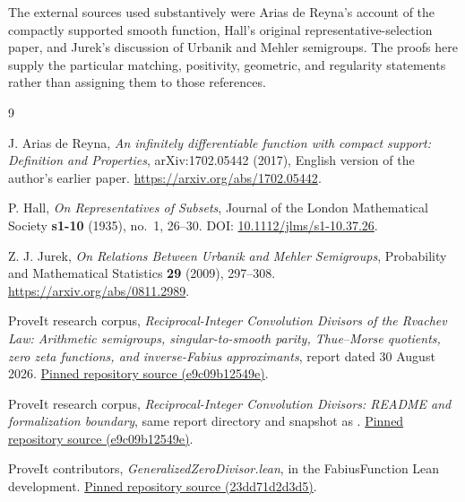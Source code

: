 \documentclass[11pt,a4paper]{article}
\theoremstyle{remark}
\begin{document}
The external sources used substantively were Arias de Reyna's account of the
compactly supported smooth function, Hall's original representative-selection
paper, and Jurek's discussion of Urbanik and Mehler semigroups. The proofs here
supply the particular matching, positivity, geometric, and regularity statements
rather than assigning them to those references.

\begin{thebibliography}{9}

J. Arias de Reyna,
\emph{An infinitely differentiable function with compact support: Definition and
Properties}, arXiv:1702.05442 (2017), English version of the author's earlier
paper.
\url{https://arxiv.org/abs/1702.05442}.

P. Hall,
\emph{On Representatives of Subsets},
Journal of the London Mathematical Society \textbf{s1-10} (1935), no.~1,
26--30. DOI: \href{https://doi.org/10.1112/jlms/s1-10.37.26}{10.1112/jlms/s1-10.37.26}.

Z. J. Jurek,
\emph{On Relations Between Urbanik and Mehler Semigroups},
Probability and Mathematical Statistics \textbf{29} (2009), 297--308.
\url{https://arxiv.org/abs/0811.2989}.

ProveIt research corpus,
\emph{Reciprocal-Integer Convolution Divisors of the Rvachev Law:
Arithmetic semigroups, singular-to-smooth parity, Thue--Morse quotients, zero
zeta functions, and inverse-Fabius approximants}, report dated 30 August 2026.
\href{https://github.com/VladimirReshetnikov/ProveIt/blob/e9c09b12549ea4e3bea7cebc52b450b761f6f581/Analysis/FabiusFunction/docs/semi-formalized-research-frontiers/drafts/spectra-and-arithmetic/Fabius_Rvachev_Reciprocal_Integer_Convolution_Divisors/Fabius_Rvachev_Reciprocal_Integer_Convolution_Divisors.tex}{Pinned repository source (e9c09b12549e)}.

ProveIt research corpus,
\emph{Reciprocal-Integer Convolution Divisors: README and formalization boundary},
same report directory and snapshot as \cite{RepoDivisors}.
\href{https://github.com/VladimirReshetnikov/ProveIt/blob/e9c09b12549ea4e3bea7cebc52b450b761f6f581/Analysis/FabiusFunction/docs/semi-formalized-research-frontiers/drafts/spectra-and-arithmetic/Fabius_Rvachev_Reciprocal_Integer_Convolution_Divisors/README.txt}{Pinned repository source (e9c09b12549e)}.

ProveIt contributors,
\emph{GeneralizedZeroDivisor.lean}, in the FabiusFunction Lean development.
\href{https://github.com/VladimirReshetnikov/ProveIt/blob/23dd71d2d3d5e85d2b97a8cc45f55e735d69a4ae/Analysis/FabiusFunction/Lean/FabiusFunction/GeneralizedZeroDivisor.lean}{Pinned repository source (23dd71d2d3d5)}.


\end{thebibliography}
\end{document}
